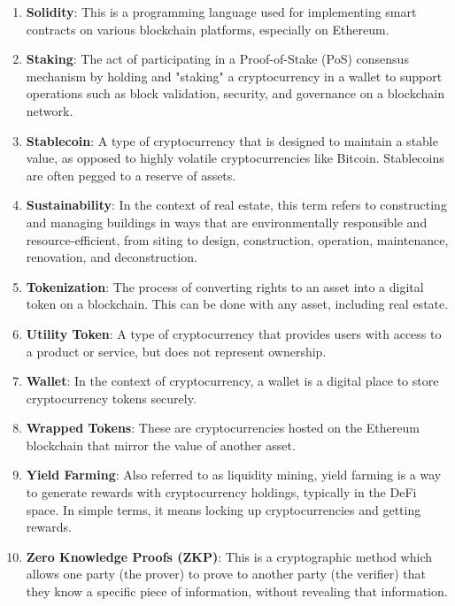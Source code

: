 \begin{enumerate}
    \item \textbf{Solidity}: This is a programming language used for implementing smart contracts on various blockchain platforms, especially on Ethereum.

    \item \textbf{Staking}: The act of participating in a Proof-of-Stake (PoS) consensus mechanism by holding and "staking" a cryptocurrency in a wallet to support operations such as block validation, security, and governance on a blockchain network.

    \item \textbf{Stablecoin}: A type of cryptocurrency that is designed to maintain a stable value, as opposed to highly volatile cryptocurrencies like Bitcoin. Stablecoins are often pegged to a reserve of assets.

    \item \textbf{Sustainability}: In the context of real estate, this term refers to constructing and managing buildings in ways that are environmentally responsible and resource-efficient, from siting to design, construction, operation, maintenance, renovation, and deconstruction.

    \item \textbf{Tokenization}: The process of converting rights to an asset into a digital token on a blockchain. This can be done with any asset, including real estate.

    \item \textbf{Utility Token}: A type of cryptocurrency that provides users with access to a product or service, but does not represent ownership.

    \item \textbf{Wallet}: In the context of cryptocurrency, a wallet is a digital place to store cryptocurrency tokens securely.

    \item \textbf{Wrapped Tokens}: These are cryptocurrencies hosted on the Ethereum blockchain that mirror the value of another asset.

    \item \textbf{Yield Farming}: Also referred to as liquidity mining, yield farming is a way to generate rewards with cryptocurrency holdings, typically in the DeFi space. In simple terms, it means locking up cryptocurrencies and getting rewards.

    \item \textbf{Zero Knowledge Proofs (ZKP)}: This is a cryptographic method which allows one party (the prover) to prove to another party (the verifier) that they know a specific piece of information, without revealing that information.

\end{enumerate}

